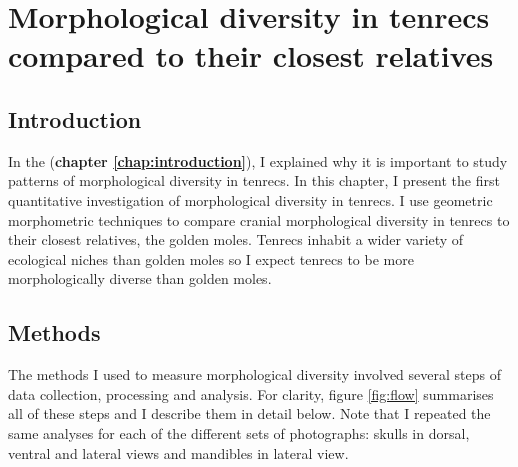 \chapter{Morphological diversity in tenrecs compared to their closest relatives}
\label{chap:disparity}


\section{Introduction}
	In the (\textbf{chapter \ref{chap:introduction}}), I explained why it is important to study patterns of morphological diversity in tenrecs.  In this chapter, I present the first quantitative investigation of morphological diversity in tenrecs. I use geometric morphometric techniques \citep{Rohlf1993} to compare cranial morphological diversity in tenrecs to their closest relatives, the golden moles. Tenrecs inhabit a wider variety of ecological niches than golden moles \citep{Soarimalala2011, Bronner1995} so I expect tenrecs to be more morphologically diverse than golden moles. 


	


\section{Methods}

	The methods I used to measure morphological diversity involved several steps of data collection, processing and analysis. For clarity,  figure \ref{fig:flow} summarises all of these steps and I describe them in detail below. Note that I repeated the same analyses for each of the different sets of photographs: skulls in dorsal, ventral and lateral views and mandibles in lateral view.
	
